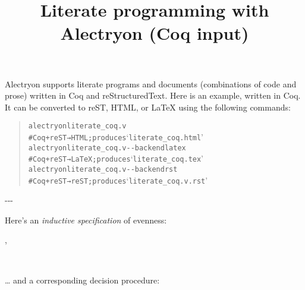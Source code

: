 \documentclass[a4paper]{article}
\begin{document}
\title{Literate programming with Alectryon (Coq input)%
  \label{literate-programming-with-alectryon-coq-input}}
\author{}
\date{}
\maketitle

Alectryon supports literate programs and documents (combinations of code and prose) written in Coq and reStructuredText.  Here is an example, written in Coq.  It can be converted to reST, HTML, or LaTeX using the following commands:

\begin{quote}
\begin{alltt}
alectryon literate_coq.v
  # Coq+reST → HTML;  produces ‘literate_coq.html’
alectryon literate_coq.v -{}-backend latex
  # Coq+reST → LaTeX; produces ‘literate_coq.tex’
alectryon literate_coq.v -{}-backend rst
  # Coq+reST → reST;  produces ‘literate_coq.v.rst’
\end{alltt}
\end{quote}

-{}-{}-

Here's an \emph{inductive specification} of evenness:

\begin{alectryon}
  \sep
  \begin{sentence}
    \begin{input}
      ~~~~~~\nl
      ~~~~\nl
      ~~~~~~~~~~~
    \end{input}
  \end{sentence}
\end{alectryon}

… and a corresponding decision procedure:
\end{document}
